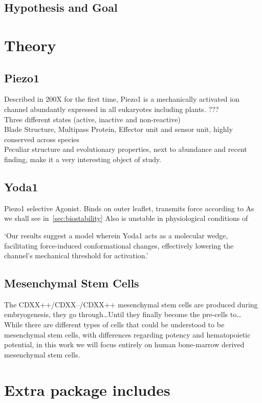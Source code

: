 \subsection{Hypothesis and Goal}


\section{Theory}

\subsection{Piezo1}
Described in 200X for the first time, Piezo1 is a  mechanically activated ion channel abundantly expressed in all eukaryotes including plants. ???\cite{Coste55} \\
Three different states (active, inactive and non-reactive)\\
Blade Structure, Multipass Protein, Effector unit and sensor unit, highly conserved across species\\
Peculiar structure and evolutionary properties, next to abundance and recent finding, make it a very interesting object of study. 

\subsection{Yoda1}
Piezo1 selective Agonist. Binds on outer leaflet, transmits force according to
As we shall see in~\vref{sec:biostability} Also is unstable in physiological conditions of 

`Our results suggest a model wherein Yoda1 acts as a molecular wedge, facilitating force-induced conformational changes, effectively lowering the channel's mechanical threshold for activation.'\cite{BotelloSmith.2019} 

\subsection{Mesenchymal Stem Cells}
The CDXX++/CDXX--/CDXX++ mesenchymal stem cells are produced during embryogenesis, they go through\dots Until they finally become the pre-cells to\dots 
While there are different types of cells that could be understood to be mesenchymal stem cells, with differences regarding potency and hematopoietic potential, in this work we will focus entirely on human bone-marrow derived mesenchymal stem cells. 

\section{Extra package includes }

